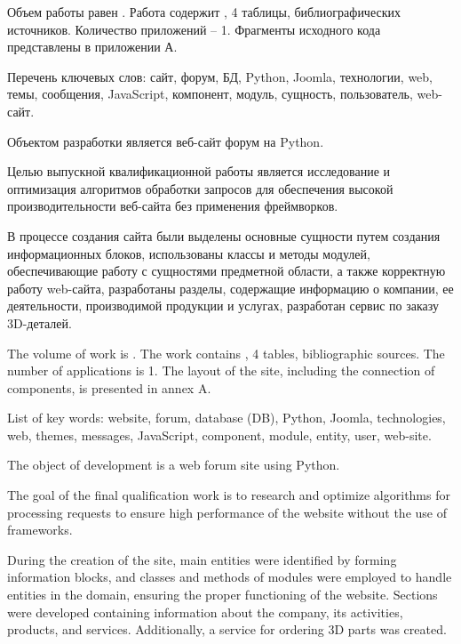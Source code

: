 
Объем работы равен . Работа содержит , 4 таблицы,  библиографических источников. Количество приложений – 1. Фрагменты исходного кода представлены в приложении А.

Перечень ключевых слов: сайт, форум, БД, Python, Joomla, технологии, web, темы, сообщения, JavaScript, компонент, модуль, сущность, пользователь, web-сайт.

Объектом разработки является веб-сайт форум на Python.

Целью выпускной квалификационной работы является исследование и оптимизация алгоритмов обработки запросов для обеспечения высокой производительности веб-сайта без применения фреймворков.

В процессе создания сайта были выделены основные сущности путем создания информационных блоков, использованы классы и методы модулей, обеспечивающие работу с сущностями предметной области, а также корректную работу web-сайта, разработаны разделы, содержащие информацию о компании, ее деятельности, производимой продукции и услугах, разработан сервис по заказу 3D-деталей.


  
The volume of work is . The work contains , 4 tables,  bibliographic sources. The number of applications is 1. The layout of the site, including the connection of components, is presented in annex A.

List of key words: website, forum, database (DB), Python, Joomla, technologies, web, themes, messages, JavaScript, component, module, entity, user, web-site.

The object of development is a web forum site using Python.

The goal of the final qualification work is to research and optimize algorithms for processing requests to ensure high performance of the website without the use of frameworks.

During the creation of the site, main entities were identified by forming information blocks, and classes and methods of modules were employed to handle entities in the domain, ensuring the proper functioning of the website. Sections were developed containing information about the company, its activities, products, and services. Additionally, a service for ordering 3D parts was created.
